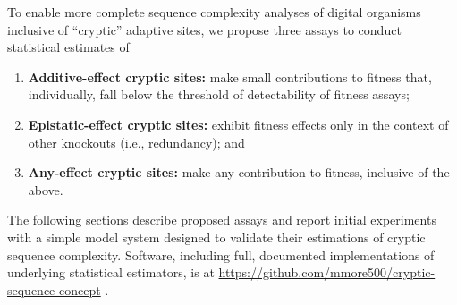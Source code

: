 



To enable more complete sequence complexity analyses of digital organisms inclusive of ``cryptic'' adaptive sites, we propose three assays to conduct statistical estimates of
\begin{enumerate}
\item \textbf{Additive-effect cryptic sites:} make small contributions to fitness that, individually, fall below the threshold of detectability of fitness assays;
\item \textbf{Epistatic-effect cryptic sites:} exhibit fitness effects only in the context of other knockouts (i.e., redundancy); and
\item \textbf{Any-effect cryptic sites:} make any contribution to fitness, inclusive of the above.
\end{enumerate}

The following sections describe proposed assays and report initial experiments with a simple model system designed to validate their estimations of cryptic sequence complexity.
Software, including full, documented implementations of underlying statistical estimators, is at \url{https://github.com/mmore500/cryptic-sequence-concept} \citep{moreno2024cryptic}.
